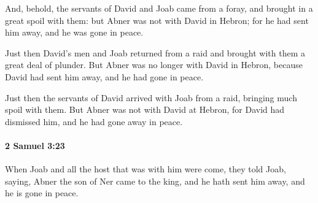 			\begin{versebox}
					\item[BHS] 
					\item[ASV] And, behold, the servants of David and Joab came from a foray, and brought in a great spoil with them: but Abner was not with David in Hebron; for he had sent him away, and he was gone in peace.
					\item[NIV] Just then David’s men and Joab returned from a raid and brought with them a great deal of plunder. But Abner was no longer with David in Hebron, because David had sent him away, and he had gone in peace.
					\item[NRSV] Just then the servants of David arrived with Joab from a raid, bringing much spoil with them. But Abner was not with David at Hebron, for David had dismissed him, and he had gone away in peace.
			\end{versebox}

		\paragraph{2 Samuel 3:23} %
			\label{2SAMUEL-3-23}

			When Joab and all the host that was with him were come, they told Joab, saying, Abner the son of Ner came to the king, and he hath sent him away, and he is gone in peace.

